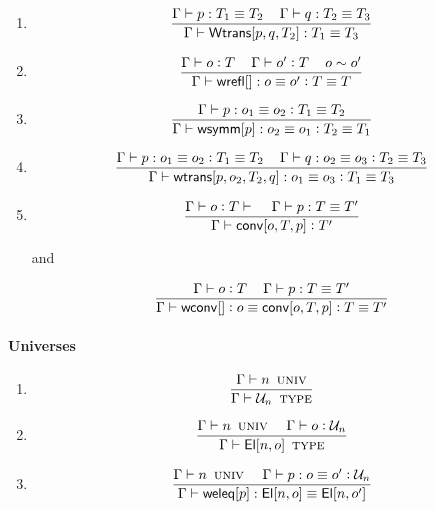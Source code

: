 \documentclass[11pt]{article}
\newcommand{\eqd}{\equiv}
\newcommand{\Eu}{{\cal U}}
\newcommand\spc{{\,\,\,\,\,\,\,}}
\newcommand{\ccolon}{\vcentcolon}
\newcommand{\ccheck}{\vcentcolon}            %
\newcommand{\csynth}{\vcentcolon\vcentcolon} %
\renewcommand{\csynth}{\ccheck}              %
\newcommand{\Univ}{\mathop{\text{ \sc univ}}}
\newcommand{\Type}{\mathop{\text{ \sc type}}}
\newcommand{\Okay}{\mathop{\text{ \sc okay}}}
\newcommand{\Context}{\vdash\Okay}
\renewcommand{\Context}{\vdash}
\newcommand{\ha}[2]{#1[#2]}
\newcommand{\Wtrans}{{\sf Wtrans}}
\newcommand{\El}{{\sf El}}
\newcommand{\annot}{{\sf annot}}
\newcommand{\haa}[2]{\ha\annot{#1,#2}}
\renewcommand{\haa}[2]{#1}
\newcommand{\conv}{{\sf conv}}
\newcommand{\wconv}{{\sf wconv}}
\newcommand{\weleq}{{\sf weleq}}
\newcommand{\wrefl}{{\sf wrefl}}
\newcommand{\wsymm}{{\sf wsymm}}
\newcommand{\wtrans}{{\sf wtrans}}
\begin{document}
\begin{enumerate}
\item 
\[
  \frac{
    \Gamma \vdash p:T_1\eqd T_2
    \spc
    \Gamma \vdash q:T_2\eqd T_3
  }
  {\Gamma \vdash \ha\Wtrans{p,q,T_2}: T_1\eqd T_3 }
\]

\item 
\[\frac{
  \Gamma \vdash o \ccheck{T}
  \spc
  \Gamma \vdash o' \ccheck{T}
  \spc
  o \sim o'
  } {
  \Gamma \vdash  \ha\wrefl{}: o \eqd o' \ccolon T \eqd T
  } 
\]

\item 
\[\frac
    {\Gamma \vdash p:o_1\eqd o_2 \ccolon T_1 \eqd T_2}
    {\Gamma \vdash \ha\wsymm{p}:o_2\eqd o_1 \ccolon T_2 \eqd T_1}\]

\item 
\[\frac{\Gamma \vdash p:o_1\eqd o_2 \ccolon T_1 \eqd T_2
  \spc
  \Gamma \vdash q:o_2\eqd o_3 \ccolon T_2 \eqd T_3
  } {
  \Gamma \vdash \ha\wtrans{p,o_2,T_2,q}:o_1\eqd o_3 \ccolon T_1 \eqd T_3}
\]

\item 
\[\frac
    { \Gamma \vdash o \ccolon T \Context \spc \Gamma \vdash p : T \eqd T'}
    { \Gamma \vdash \ha\conv{o,T,p} \ccolon T' }\]

and

\[\frac
    { \Gamma \vdash o \ccolon T \spc
      \Gamma \vdash p : T \eqd T' }
    { \Gamma \vdash \ha\wconv{} \ccolon o \eqd \ha\conv{o,T,p} \ccolon T \eqd T'}\]




\end{enumerate}

\paragraph{Universes}

\begin{enumerate}

\item

\[\frac{\Gamma \vdash n \Univ  }
       {\Gamma \vdash \Eu_n \Type  }\]

\item

\[\frac{
  \Gamma \vdash n \Univ  
  \spc
  \Gamma \vdash o \csynth{\Eu_n}}{
  \Gamma \vdash \ha\El{n,o}\Type }\]

\item 

\[\frac{
  \Gamma \vdash n \Univ 
  \spc
  \Gamma \vdash p : o \eqd o' \ccheck{\Eu_n}
}
       {\Gamma \vdash \ha\weleq{p} : \ha\El{n,o} \eqd \ha\El{n,o'}}\]

\end{enumerate}
\end{document}
